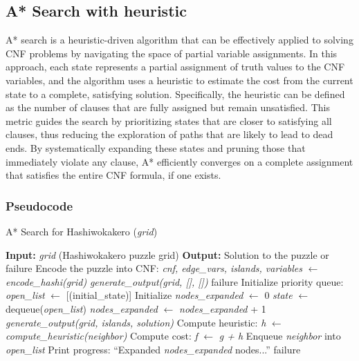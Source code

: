 \subsection{A* Search with heuristic}
\noindent A* search is a heuristic-driven algorithm that can be effectively applied to solving CNF problems by navigating the space of partial variable assignments. In this approach, each state represents a partial assignment of truth values to the CNF variables, and the algorithm uses a heuristic to estimate the cost from the current state to a complete, satisfying solution. Specifically, the heuristic can be defined as the number of clauses that are fully assigned but remain unsatisfied. This metric guides the search by prioritizing states that are closer to satisfying all clauses, thus reducing the exploration of paths that are likely to lead to dead ends. By systematically expanding these states and pruning those that immediately violate any clause, A* efficiently converges on a complete assignment that satisfies the entire CNF formula, if one exists.

\subsubsection{Pseudocode}
\begin{algorithm}[H]
    \caption{A* Search for Hashiwokakero (\textit{grid})}
    \label{alg:astar_hashiwokakero}
    \begin{algorithmic}[1]
        \State \textbf{Input:} \textit{grid} (Hashiwokakero puzzle grid)
        \State \textbf{Output:} Solution to the puzzle or failure
        \State Encode the puzzle into CNF: \textit{cnf, edge\_vars, islands, variables} $\gets$ \textit{encode\_hashi(grid)}
        \State \Return \textit{generate\_output(grid, [], [])}
        \Else
        \State \Return failure
        \EndIf
        \EndIf
        \State Initialize priority queue: \textit{open\_list} $\gets$ [(initial\_state)]
        \State Initialize \textit{nodes\_expanded} $\gets$ 0
        \State \textit{state} $\gets$ dequeue(\textit{open\_list})
        \State \textit{nodes\_expanded} $\gets$ \textit{nodes\_expanded} + 1
        \State \Return \textit{generate\_output(grid, islands, solution)}
        \EndIf
        \State Compute heuristic: \textit{h} $\gets$ \textit{compute\_heuristic(neighbor)}
        \State Compute cost: \textit{f} $\gets$ \textit{g + h}
        \State Enqueue \textit{neighbor} into \textit{open\_list}
        \EndIf
        \EndFor
        \State Print progress: ``Expanded \textit{nodes\_expanded} nodes...''
        \EndIf
        \EndWhile
        \State \Return failure
    \end{algorithmic}
\end{algorithm}

